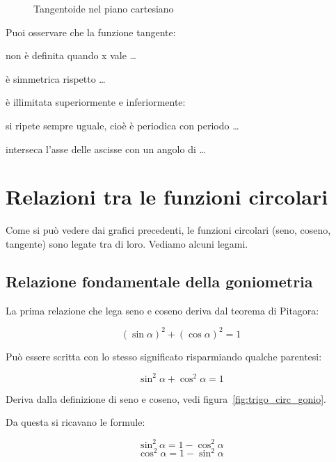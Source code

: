\begin{figure}[!h] 
 \vspace{-6pt}
  \begin{center}
\begin{inaccessibleblock}
    
    \caption{Tangentoide nel piano cartesiano}
    \label{fig:trigo_sin}
\end{inaccessibleblock}
  \end{center}
   \vspace{-24pt}
\end{figure} 
Puoi osservare che la funzione tangente:
\begin{itemize*}
 \item non è definita quando x vale \dots
 \item è simmetrica rispetto \dots
 \item è illimitata superiormente e inferiormente:
 \item si ripete sempre uguale, cioè è periodica con periodo \dots
 \item interseca l'asse delle ascisse con un angolo di \dots
\end{itemize*}

\section{Relazioni tra le funzioni circolari}
\label{sec:gonio_relazioni}

Come si può vedere dai grafici precedenti, le funzioni circolari (seno, coseno, 
tangente) sono legate tra di loro. Vediamo alcuni legami.

\subsection{Relazione fondamentale della goniometria}

La prima relazione che lega seno e coseno deriva dal teorema di Pitagora:

\[\left(\sin \alpha \right)^2 + \left(\cos \alpha \right)^2 = 1\]

Può essere scritta con lo stesso significato risparmiando qualche parentesi:

\[\sin^2 \alpha + \cos^2 \alpha = 1\]

Deriva dalla definizione di seno e coseno, vedi 
figura~\ref{fig:trigo_circ_gonio}.

Da questa si ricavano le formule:

\[\sin^2 \alpha = 1 - \cos^2 \alpha\]
\[\cos^2 \alpha = 1 - \sin^2 \alpha\]

